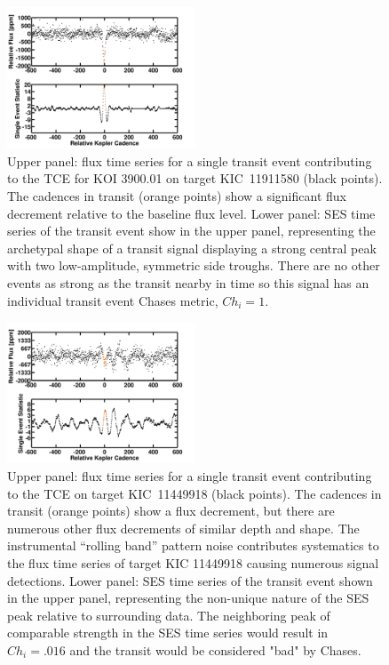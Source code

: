 \begin{figure}[htb]
\includegraphics[width=0.5\textwidth]{kic11911580_cleanhighsnr.png}
\caption{Upper panel: flux time series for a single transit event contributing to the TCE for KOI 3900.01 on target KIC~11911580 (black points).  The cadences in transit (orange points) show a significant flux decrement relative to the baseline flux level.  Lower panel: SES time series of the transit event show in the upper panel, representing the archetypal shape of a transit signal displaying a strong central peak with two low-amplitude, symmetric side troughs. There are no other events as strong as the transit nearby in time so this signal has an individual transit event Chases metric, $Ch_{i}=1$.}
\label{fig:chases1}
\end{figure}

\begin{figure}[htb]
\includegraphics[width=0.5\textwidth]{kic11449918_rb.png}
\caption{Upper panel: flux time series for a single transit event contributing to the TCE on target KIC~11449918 (black points).  The cadences in transit (orange points) show a flux decrement, but there are numerous other flux decrements of similar depth and shape.  The instrumental ``rolling band'' pattern noise contributes systematics to the flux time series of target KIC 11449918 causing numerous signal detections.  Lower panel: SES time series of the transit event shown in the upper panel, representing the non-unique nature of the SES peak relative to surrounding data. The neighboring peak of comparable strength in the SES time series would result in $Ch_{i}=.016$ and the transit would be considered "bad" by Chases. }
\label{fig:chases2}
\end{figure}

